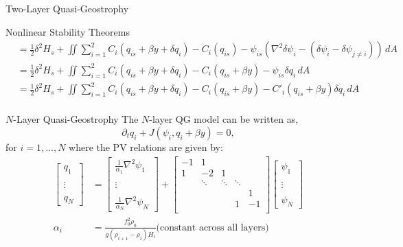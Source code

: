 \documentclass[12pt]{article}
\begin{document}
\begin{section}{Two-Layer Quasi-Geostrophy}
\begin{subsection}{Nonlinear Stability Theorems}
\begin{align*}
            &= \frac12 \delta^2 H_s + \iint \sum_{i=1}^2 C_i(q_{is} + \beta y + \delta q_i) - C_i(q_{is}) - \psi_{is}(\nabla^2\delta\psi_i - (\delta\psi_i - \delta\psi_{j \ne i})) \, dA \\
            &= \frac12 \delta^2 H_s + \iint \sum_{i=1}^2 C_i(q_{is} + \beta y + \delta q_i) - C_i(q_{is} + \beta y) - \psi_{is}\delta q_i \, dA \\
            &= \frac12 \delta^2 H_s + \iint \sum_{i=1}^2 C_i(q_{is} + \beta y + \delta q_i) - C_i(q_{is} + \beta y) - C'_i(q_{is} + \beta y)\delta q_i \, dA \\
        \end{align*}
    \end{subsection}
\end{section}

\newpage
\begin{section}{$N$-Layer Quasi-Geostrophy}
    The $N$-layer QG model can be written as,
    $$
    \partial_t q_i + J(\psi_i, q_i + \beta y) = 0,
    $$
    for $i=1,...,N$ where the PV relations are given by:
    \begin{align*}
        \left[\begin{array}{c}
        q_1 \\
        \\
        \vdots \\
        \\
        q_N
        \end{array}\right]
        &=
        \left[\begin{array}{c}
        \frac{1}{\alpha_1}\nabla^2 \psi_1 \\
        \\
        \vdots \\
        \\
        \frac{1}{\alpha_N}\nabla^2 \psi_N
        \end{array}\right]
        +
        \left[\begin{array}{ccccc}
        -1 & 1 & & & \\
        1 & -2 & 1 & & \\
        & \ddots & \ddots & \ddots & \\
        & & & & 1 \\
        & & & 1 & -1\\
        \end{array}\right]
        \left[\begin{array}{c}
        \psi_1 \\
        \\
        \vdots \\
        \\
        \psi_N
        \end{array}\right] \\
        \alpha_i &= \frac{f_0^2 \rho_0}{g (\rho_{i+1} - \rho_i) H_i} \text{(constant across all layers)}
    \end{align*}


\end{section}
\end{document}
